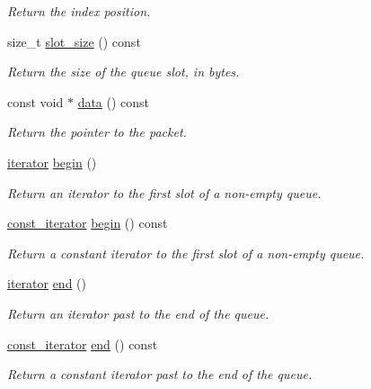 \begin{DoxyCompactItemize}
\begin{DoxyCompactList}\small\item\em Return the index position. \end{DoxyCompactList}\item 
size\+\_\+t \hyperlink{classpfq_1_1queue_aa8ec2b1bd7c4fb2ec924f356c95b81ae}{slot\+\_\+size} () const 
\begin{DoxyCompactList}\small\item\em Return the size of the queue slot, in bytes. \end{DoxyCompactList}\item 
const void $\ast$ \hyperlink{classpfq_1_1queue_a62d08cb3627ed37a7f04aa58410ba8d7}{data} () const 
\begin{DoxyCompactList}\small\item\em Return the pointer to the packet. \end{DoxyCompactList}\item 
\hyperlink{structpfq_1_1queue_1_1iterator}{iterator} \hyperlink{classpfq_1_1queue_a107c15e5be3e53fc2dc7f8e25b3fba1e}{begin} ()
\begin{DoxyCompactList}\small\item\em Return an iterator to the first slot of a non-\/empty queue. \end{DoxyCompactList}\item 
\hyperlink{structpfq_1_1queue_1_1const__iterator}{const\+\_\+iterator} \hyperlink{classpfq_1_1queue_a9769ca50f14b7a5ca7196a2ec3608d44}{begin} () const 
\begin{DoxyCompactList}\small\item\em Return a constant iterator to the first slot of a non-\/empty queue. \end{DoxyCompactList}\item 
\hyperlink{structpfq_1_1queue_1_1iterator}{iterator} \hyperlink{classpfq_1_1queue_a1f2bcf8ef825d3c9d7761f2e4b4ed6dd}{end} ()
\begin{DoxyCompactList}\small\item\em Return an iterator past to the end of the queue. \end{DoxyCompactList}\item 
\hyperlink{structpfq_1_1queue_1_1const__iterator}{const\+\_\+iterator} \hyperlink{classpfq_1_1queue_a9cdca273d220e3eaa5ae1274d130174d}{end} () const 
\begin{DoxyCompactList}\small\item\em Return a constant iterator past to the end of the queue. \end{DoxyCompactList}\item 

\end{DoxyCompactItemize}
